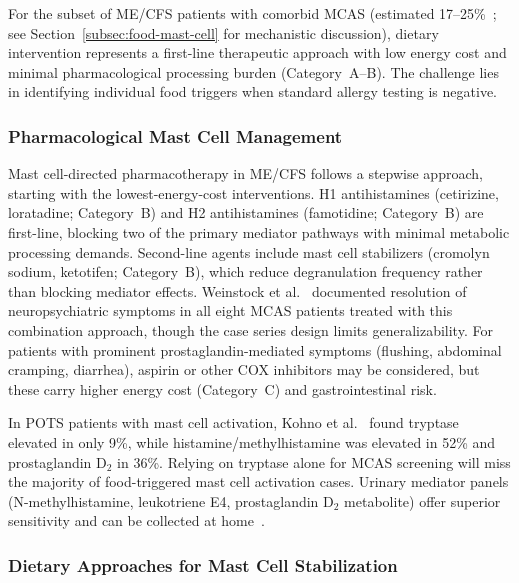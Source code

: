 For the subset of ME/CFS patients with comorbid MCAS (estimated 17--25\%~\cite{Rohrhofer2025mecfsmast}; see Section~\ref{subsec:food-mast-cell} for mechanistic discussion), dietary intervention represents a first-line therapeutic approach with low energy cost and minimal pharmacological processing burden (Category~A--B). The challenge lies in identifying individual food triggers when standard allergy testing is negative.

\subsubsection{Pharmacological Mast Cell Management}

Mast cell-directed pharmacotherapy in ME/CFS follows a stepwise approach, starting with the lowest-energy-cost interventions. H1 antihistamines (cetirizine, loratadine; Category~B) and H2 antihistamines (famotidine; Category~B) are first-line, blocking two of the primary mediator pathways with minimal metabolic processing demands. Second-line agents include mast cell stabilizers (cromolyn sodium, ketotifen; Category~B), which reduce degranulation frequency rather than blocking mediator effects. Weinstock et al.~\cite{Weinstock2023MCASneuro} documented resolution of neuropsychiatric symptoms in all eight MCAS patients treated with this combination approach, though the case series design limits generalizability. For patients with prominent prostaglandin-mediated symptoms (flushing, abdominal cramping, diarrhea), aspirin or other COX inhibitors may be considered, but these carry higher energy cost (Category~C) and gastrointestinal risk.

\begin{warning}
\label{warn:tryptase-food-mcas}
In POTS patients with mast cell activation, Kohno et al.~\cite{Kohno2021potsmast} found tryptase elevated in only 9\%, while histamine/methylhistamine was elevated in 52\% and prostaglandin D$_2$ in 36\%. Relying on tryptase alone for MCAS screening will miss the majority of food-triggered mast cell activation cases. Urinary mediator panels (N-methylhistamine, leukotriene E4, prostaglandin D$_2$ metabolite) offer superior sensitivity and can be collected at home~\cite{Voelker2024urinemast,Voelker2025biomarkersmast}.
\end{warning}

\subsubsection{Dietary Approaches for Mast Cell Stabilization}
\label{subsubsec:dietary-mcas}

